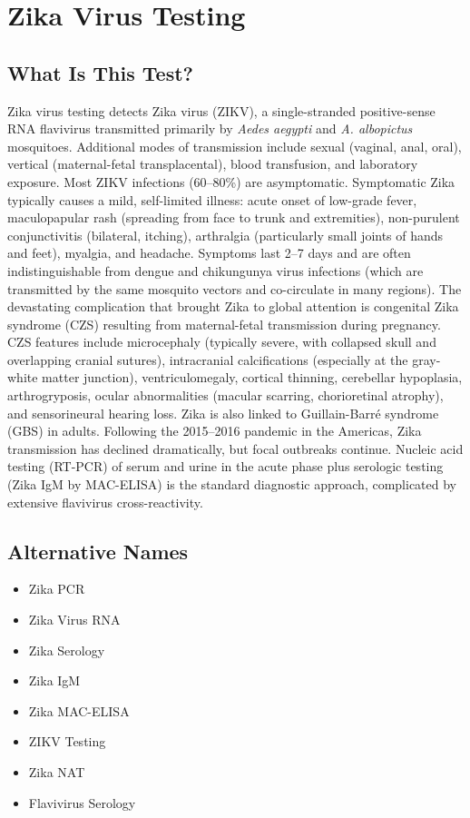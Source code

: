 \chapter{Zika Virus Testing}

\section*{What Is This Test?}
Zika virus testing detects Zika virus (ZIKV), a single-stranded positive-sense RNA flavivirus transmitted primarily by \textit{Aedes aegypti} and \textit{A. albopictus} mosquitoes. Additional modes of transmission include sexual (vaginal, anal, oral), vertical (maternal-fetal transplacental), blood transfusion, and laboratory exposure. Most ZIKV infections (60--80\%) are asymptomatic. Symptomatic Zika typically causes a mild, self-limited illness: acute onset of low-grade fever, maculopapular rash (spreading from face to trunk and extremities), non-purulent conjunctivitis (bilateral, itching), arthralgia (particularly small joints of hands and feet), myalgia, and headache. Symptoms last 2--7 days and are often indistinguishable from dengue and chikungunya virus infections (which are transmitted by the same mosquito vectors and co-circulate in many regions). The devastating complication that brought Zika to global attention is congenital Zika syndrome (CZS) resulting from maternal-fetal transmission during pregnancy. CZS features include microcephaly (typically severe, with collapsed skull and overlapping cranial sutures), intracranial calcifications (especially at the gray-white matter junction), ventriculomegaly, cortical thinning, cerebellar hypoplasia, arthrogryposis, ocular abnormalities (macular scarring, chorioretinal atrophy), and sensorineural hearing loss. Zika is also linked to Guillain-Barré syndrome (GBS) in adults. Following the 2015--2016 pandemic in the Americas, Zika transmission has declined dramatically, but focal outbreaks continue. Nucleic acid testing (RT-PCR) of serum and urine in the acute phase plus serologic testing (Zika IgM by MAC-ELISA) is the standard diagnostic approach, complicated by extensive flavivirus cross-reactivity.

\section*{Alternative Names}
\begin{itemize}
  \item Zika PCR
  \item Zika Virus RNA
  \item Zika Serology
  \item Zika IgM
  \item Zika MAC-ELISA
  \item ZIKV Testing
  \item Zika NAT
  \item Flavivirus Serology
\end{itemize}
